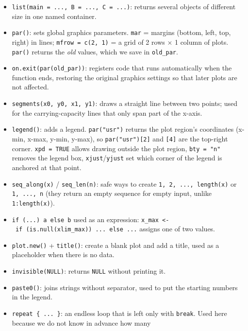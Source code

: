\documentclass[
]{article}
\begin{document}
\begin{itemize}
  columns can be accessed with \texttt{\$} (e.g.~\texttt{output\$B\$A}).
  \texttt{as.data.frame(NULL)} gives an empty data frame with 0 rows,
  which is how we detect runs that ended before the split.
\item
  \texttt{list(main\ =\ ...,\ B\ =\ ...,\ C\ =\ ...)}: returns several
  objects of different size in one named container.
\item
  \texttt{par()}: sets global graphics parameters. \texttt{mar} =
  margins (bottom, left, top, right) in lines;
  \texttt{mfrow\ =\ c(2,\ 1)} = a grid of 2 rows × 1 column of plots.
  \texttt{par()} returns the \emph{old} values, which we save in
  \texttt{old\_par}.
\item
  \texttt{on.exit(par(old\_par))}: registers code that runs
  automatically when the function ends, restoring the original graphics
  settings so that later plots are not affected.
\item
  \texttt{segments(x0,\ y0,\ x1,\ y1)}: draws a straight line between
  two points; used for the carrying-capacity lines that only span part
  of the x-axis.
\item
  \texttt{legend()}: adds a legend. \texttt{par("usr")} returns the plot
  region's coordinates (x-min, x-max, y-min, y-max), so
  \texttt{par("usr"){[}2{]}} and \texttt{{[}4{]}} are the top-right
  corner. \texttt{xpd\ =\ TRUE} allows drawing outside the plot region,
  \texttt{bty\ =\ "n"} removes the legend box,
  \texttt{xjust}/\texttt{yjust} set which corner of the legend is
  anchored at that point.
\item
  \texttt{seq\_along(x)} / \texttt{seq\_len(n)}: safe ways to create
  \texttt{1,\ 2,\ ...,\ length(x)} or \texttt{1,\ ...,\ n} (they return
  an empty sequence for empty input, unlike \texttt{1:length(x)}).
\item
  \texttt{if\ (...)\ a\ else\ b} used as an expression:
  \texttt{x\_max\ \textless{}-\ if\ (is.null(xlim\_max))\ ...\ else\ ...}
  assigns one of two values.
\item
  \texttt{plot.new()} + \texttt{title()}: create a blank plot and add a
  title, used as a placeholder when there is no data.
\item
  \texttt{invisible(NULL)}: returns \texttt{NULL} without printing it.
\item
  \texttt{paste0()}: joins strings without separator, used to put the
  starting numbers in the legend.
\item
  \texttt{repeat\ \{\ ...\ \}}: an endless loop that is left only with
  \texttt{break}. Used here because we do not know in advance how many

\end{itemize}
\end{document}
